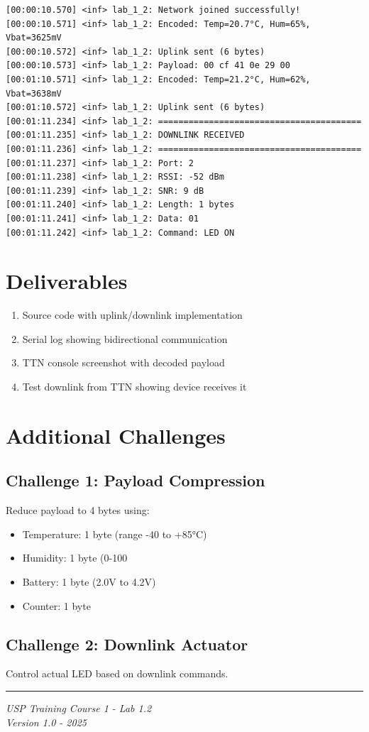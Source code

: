 \documentclass[11pt,a4paper]{article}
\begin{document}
\begin{lstlisting}
[00:00:10.570] <inf> lab_1_2: Network joined successfully!
[00:00:10.571] <inf> lab_1_2: Encoded: Temp=20.7°C, Hum=65%, Vbat=3625mV
[00:00:10.572] <inf> lab_1_2: Uplink sent (6 bytes)
[00:00:10.573] <inf> lab_1_2: Payload: 00 cf 41 0e 29 00
[00:01:10.571] <inf> lab_1_2: Encoded: Temp=21.2°C, Hum=62%, Vbat=3638mV
[00:01:10.572] <inf> lab_1_2: Uplink sent (6 bytes)
[00:01:11.234] <inf> lab_1_2: ========================================
[00:01:11.235] <inf> lab_1_2: DOWNLINK RECEIVED
[00:01:11.236] <inf> lab_1_2: ========================================
[00:01:11.237] <inf> lab_1_2: Port: 2
[00:01:11.238] <inf> lab_1_2: RSSI: -52 dBm
[00:01:11.239] <inf> lab_1_2: SNR: 9 dB
[00:01:11.240] <inf> lab_1_2: Length: 1 bytes
[00:01:11.241] <inf> lab_1_2: Data: 01
[00:01:11.242] <inf> lab_1_2: Command: LED ON
\end{lstlisting}

\section{Deliverables}

\begin{enumerate}[itemsep=10pt]
    \item Source code with uplink/downlink implementation
    \item Serial log showing bidirectional communication
    \item TTN console screenshot with decoded payload
    \item Test downlink from TTN showing device receives it
\end{enumerate}

\section{Additional Challenges}

\subsection{Challenge 1: Payload Compression}
Reduce payload to 4 bytes using:
\begin{itemize}
    \item Temperature: 1 byte (range -40 to +85°C)
    \item Humidity: 1 byte (0-100%
    \item Battery: 1 byte (2.0V to 4.2V)
    \item Counter: 1 byte
\end{itemize}

\subsection{Challenge 2: Downlink Actuator}
Control actual LED based on downlink commands.

\vfill
\noindent\rule{\textwidth}{0.4pt}
\begin{center}
\textit{USP Training Course 1 - Lab 1.2}\\
\textit{Version 1.0 - 2025}
\end{center}
\end{document}
